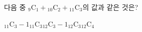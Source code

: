 다음 중 ${}_9\mathrm{C}_1+{}_{10}\mathrm{C}_2+{}_{11}\mathrm{C}_3$의 값과 같은 것은?
\begin{choices32}{${}_{11}\mathrm{C}_3-1$}{${}_{11}\mathrm{C}_3$}{${}_{12}\mathrm{C}_3-1$}{${}_{12}\mathrm{C}_3$}{${}_{12}\mathrm{C}_4$}\end{choices32}
